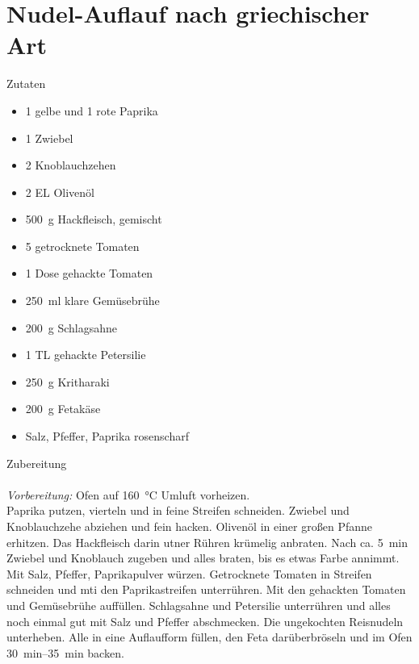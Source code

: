 \section*{Nudel-Auflauf nach griechischer Art}
\ihead{}\ohead{}
\cfoot{}
{\Large Zutaten}
\begin{multicols}{2}
\begin{itemize}
    \item \num{1} gelbe und \num{1} rote Paprika
    \item \num{1} Zwiebel
    \item \num{2} Knoblauchzehen
    \item \num{2} EL Olivenöl
    \item \SI{500}{g} Hackfleisch, gemischt
    \item \num{5} getrocknete Tomaten
    \item \num{1} Dose gehackte Tomaten
    \item \SI{250}{ml} klare Gemüsebrühe
    \item \SI{200}{g} Schlagsahne
    \item \num{1} TL gehackte Petersilie
    \item \SI{250}{g} Kritharaki
    \item \SI{200}{g} Fetakäse
    \item Salz, Pfeffer, Paprika rosenscharf
\end{itemize}
\end{multicols}
\noindent
{\Large Zubereitung}\\
\\
\textit{Vorbereitung:} Ofen auf \SI{160}{\celsius} Umluft vorheizen.\\
Paprika putzen, vierteln und in feine Streifen schneiden.
Zwiebel und Knoblauchzehe abziehen und fein hacken.
Olivenöl in einer großen Pfanne erhitzen.
Das Hackfleisch darin utner Rühren krümelig anbraten.
Nach ca. \SI{5}{min} Zwiebel und Knoblauch zugeben und alles braten, bis es etwas Farbe annimmt.
Mit Salz, Pfeffer, Paprikapulver würzen.
Getrocknete Tomaten in Streifen schneiden und mti den Paprikastreifen unterrühren.
Mit den gehackten Tomaten und Gemüsebrühe auffüllen.
Schlagsahne und Petersilie unterrühren und alles noch einmal gut mit Salz und Pfeffer abschmecken.
Die ungekochten Reisnudeln unterheben.
Alle in eine Auflaufform füllen, den Feta darüberbröseln und im Ofen \SIrange{30}{35}{min} backen.